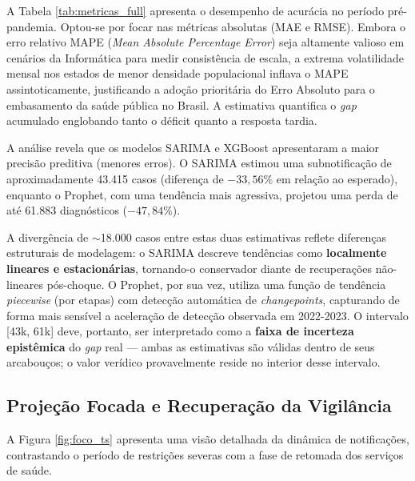 A Tabela \ref{tab:metricas_full} apresenta o desempenho de acurácia no período pré-pandemia. Optou-se por focar nas métricas absolutas (MAE e RMSE). Embora o erro relativo MAPE (\textit{Mean Absolute Percentage Error}) seja altamente valioso em cenários da Informática para medir consistência de escala, a extrema volatilidade mensal nos estados de menor densidade populacional inflava o MAPE assintoticamente, justificando a adoção prioritária do Erro Absoluto para o embasamento da saúde pública no Brasil. A estimativa quantifica o \textit{gap} acumulado englobando tanto o déficit quanto a resposta tardia.

\begin{table}[H]
\centering
\caption{Comparativo Multimodelo e Estimativa de Subnotificação (Pandemia 2020-2022 vs. Recuperação 2023-2024)}
\label{tab:metricas_full}
\resizebox{\textwidth}{!}{%

}
\end{table}

A análise revela que os modelos SARIMA e XGBoost apresentaram a maior precisão preditiva (menores erros). O SARIMA estimou uma subnotificação de aproximadamente 43.415 casos (diferença de $-33{,}56\%$ em relação ao esperado), enquanto o Prophet, com uma tendência mais agressiva, projetou uma perda de até 61.883 diagnósticos ($-47{,}84\%$).

A divergência de $\sim$18.000 casos entre estas duas estimativas reflete diferenças estruturais de modelagem: o SARIMA descreve tendências como \textbf{localmente lineares e estacionárias}, tornando-o conservador diante de recuperações não-lineares pós-choque. O Prophet, por sua vez, utiliza uma função de tendência \textit{piecewise} (por etapas) com detecção automática de \textit{changepoints}, capturando de forma mais sensível a aceleração de detecção observada em 2022-2023. O intervalo {[}43k, 61k{]} deve, portanto, ser interpretado como a \textbf{faixa de incerteza epistêmica} do \textit{gap} real — ambas as estimativas são válidas dentro de seus arcabouços; o valor verídico provavelmente reside no interior desse intervalo.

\subsection{Projeção Focada e Recuperação da Vigilância}

A Figura \ref{fig:foco_ts} apresenta uma visão detalhada da dinâmica de notificações, contrastando o período de restrições severas com a fase de retomada dos serviços de saúde.

